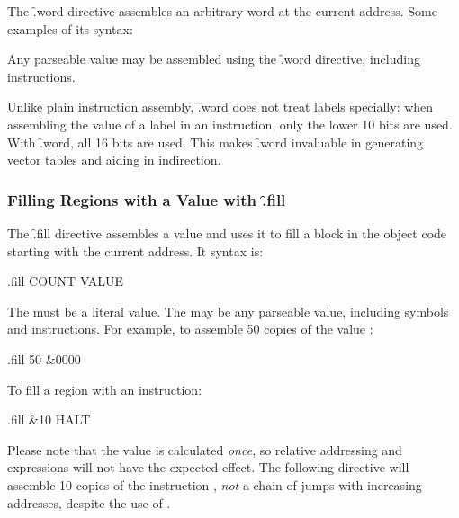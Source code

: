 The \f{.word} directive assembles an arbitrary word at the current
address. Some examples of its syntax:


Any parseable value may be assembled using the \f{.word} directive, including
instructions.

Unlike plain instruction assembly, \f{.word} does not treat labels specially:
when assembling the value of a label in an instruction, only the lower 10 bits
are used. With \f{.word}, all 16 bits are used. This makes \f{.word} invaluable
in generating vector tables and aiding in indirection.



\subsubsection{Filling Regions with a Value with \f{.fill}}

The \f{.fill} directive assembles a value and uses it to fill a block in the
object code starting with the current address. It syntax is:

\begin{cftasmcode}
.fill COUNT VALUE
\end{cftasmcode}

The  must be a literal value. The  may be any parseable
value, including symbols and instructions. For example, to assemble 50 copies
of the value :

\begin{cftasmcode}
.fill 50 &0000
\end{cftasmcode}

To fill a region with an instruction:

\begin{cftasmcode}
.fill &10 HALT
\end{cftasmcode}

Please note that the value is calculated {\em once}, so relative addressing and
expressions will not have the expected effect. The following directive will
assemble 10 copies of the instruction , {\em not\/} a chain of jumps
with increasing addresses, despite the use of .

